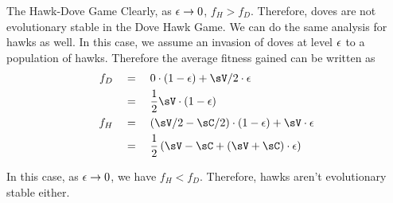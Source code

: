 \documentclass{article}
\begin{document}
\begin{ssection}{The Hawk-Dove Game}
	Clearly, as $\epsilon \rightarrow 0$, $f_H > f_D$. Therefore, doves are not evolutionary stable in the Dove Hawk Game. We can do the same analysis for hawks as well. In this case, we assume an invasion of doves at level $\epsilon$ to a population of hawks. Therefore the average fitness gained can be written as
	\begin{align*}
		f_D &\eq 0 \cdot (1 - \eps) + \sV/2 \cdot \eps \\ &\eq \frac{1}{2} \sV \cdot (1 - \eps) \\
		f_H &\eq (\sV/2 - \sC/2) \cdot (1 - \eps) + \sV \cdot \eps \\ &\eq \frac{1}{2} \para{\sV - \sC +(\sV + \sC) \cdot \eps}
	\end{align*}

	In this case, as $\epsilon \rightarrow 0$, we have $f_H < f_D$. Therefore, hawks aren't evolutionary stable either.

\end{ssection}
\end{document}
